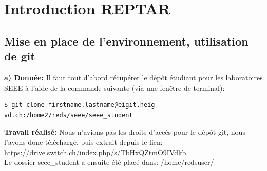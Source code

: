 \newpage
\section{Introduction REPTAR}
\subsection{Mise en place de l'environnement, utilisation de git}
\textbf{a) Donnée: }Il faut tout d'abord récupérer le dépôt étudiant pour les laboratoires SEEE à l'aide de la commande
suivante (via une fenêtre de terminal):
\begin{lstlisting}
$ git clone firstname.lastname@eigit.heig-vd.ch:/home2/reds/seee/seee_student
\end{lstlisting}
\textbf{Travail réalisé: }
Nous n'avions pas les droits d'accès pour le dépôt git, nous l'avons donc téléchargé, puis extrait depuis le lien:
\url{https://drive.switch.ch/index.php/s/TbHxQZtmO9IVdkb}.\\
Le dossier seee\_student a ensuite été placé dans: /home/redsuser/\\

